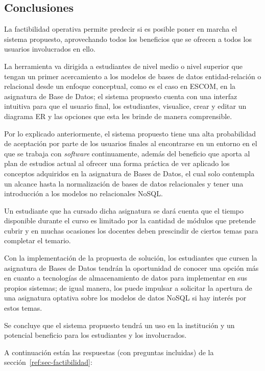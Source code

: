 \subsection{Conclusiones}

La factibilidad operativa permite predecir si es posible poner en marcha el sistema propuesto, aprovechando todos los beneficios que se ofrecen a todos los usuarios involucrados en ello.


La herramienta va dirigida a estudiantes de nivel medio o nivel superior que tengan un primer acercamiento a los modelos de bases de datos entidad-relación o relacional desde un enfoque conceptual, como es el caso en ESCOM, en la asignatura de Base de Datos; el sistema propuesto cuenta con una interfaz intuitiva para que el usuario final, los estudiantes, visualice, crear y editar un diagrama ER y las opciones que esta les brinde de manera comprensible.


Por lo explicado anteriormente, el sistema propuesto tiene una alta probabilidad de aceptación por parte de los usuarios finales al encontrarse en un entorno en el que se trabaja con \textit{software} continuamente, además del beneficio que aporta al plan de estudios actual al ofrecer una forma práctica de ver aplicado los conceptos adquiridos en la asignatura de Bases de Datos, el cual solo contempla un alcance hasta la normalización de bases de datos relacionales y tener una introducción a los modelos no relacionales NoSQL.


Un estudiante que ha cursado dicha asignatura se dará cuenta que el tiempo disponible durante el curso es limitado por la cantidad de módulos que pretende cubrir y en muchas ocasiones los docentes deben prescindir de ciertos temas para completar el temario.


Con la implementación de la propuesta de solución, los estudiantes que cursen la asignatura de Bases de Datos tendrán la oportunidad de conocer una opción más en cuanto a tecnologías de almacenamiento de datos para implementar en sus propios sistemas; de igual manera, los puede impulsar a solicitar la apertura de una asignatura optativa sobre los modelos de datos NoSQL si hay interés por estos temas.


Se concluye que el sistema propuesto tendrá un uso en la institución y un potencial beneficio para los estudiantes y los involucrados.


A continuación están las respuestas (con preguntas incluidas) de la sección~\ref{ref:sec-factibilidad}:


